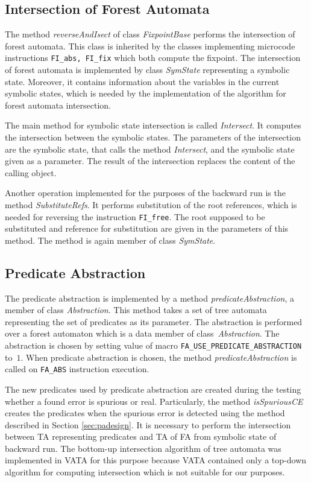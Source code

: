 \subsection{Intersection of Forest Automata}
\label{subsec:isectimpl}

The method \emph{reverseAndIsect} of class \emph{FixpointBase}
performs the intersection of forest automata.
This class is inherited by the classes implementing microcode
instructions {\tt FI\_abs, FI\_fix} which both compute the fixpoint.
The intersection of forest automata is implemented by class \emph{SymState}
representing a symbolic state.
Moreover, it contains information about the variables in the current
symbolic states, which is needed by the implementation of the algorithm
for forest automata intersection.

The main method for symbolic state intersection is called \emph{Intersect}.
It computes the intersection between the symbolic states.
The parameters of the intersection are the symbolic state, that calls the method \emph{Intersect},
and the symbolic state given as a parameter.
The result of the intersection replaces the content of the calling object.

Another operation implemented for the purposes of the backward run is
the method \emph{SubstituteRefs}.
It performs substitution of the root references, which is needed
for reversing the instruction {\tt FI\_free}.
The root supposed to be substituted and reference for substitution are
given in the parameters of this method.
The method is again member of class \emph{SymState}.

\subsection{Predicate Abstraction}
\label{subsec:paimpl}

The predicate abstraction is implemented by a method \emph{predicateAbstraction},
a member of class \emph{Abstraction}.
This method takes a set of tree automata representing the set of predicates
as its parameter.
The abstraction is performed over a forest automaton which is a data member of
class~\emph{Abstraction}.
The abstraction is chosen by setting value of macro
{\tt FA\_USE\_PREDICATE\_ABSTRACTION} to~$1$.
When predicate abstraction is chosen, the method \emph{predicateAbstraction}
is called on {\tt FA\_ABS} instruction execution.

The new predicates used by predicate abstraction are created during
the testing whether a found error is spurious or real.
Particularly, the method \emph{isSpuriousCE} creates the predicates
when the spurious error is detected using the method described
in Section \ref{sec:padesign}.
It is necessary to perform the intersection between TA representing
predicates and TA of FA from symbolic state of backward run.
The bottom-up intersection algorithm of tree automata was implemented
in VATA for this purpose because VATA contained only a top-down
algorithm for computing intersection which is not suitable for our purposes.

